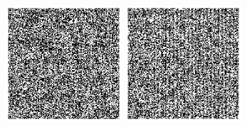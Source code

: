 \documentclass[twocolumn]{article}
\begin{document}
\includegraphics[height=1.7in]{q13}
\includegraphics[height=1.7in]{q14}

{}

\end{document}
